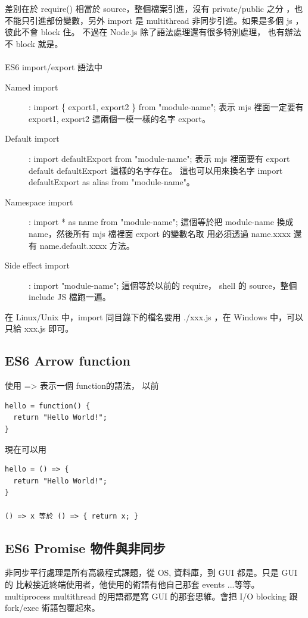   差別在於 require() 相當於 source，整個檔案引進，沒有 private/public 之分
  ，也不能只引進部份變數，另外 import 是 multithread 非同步引進。如果是多個
  js ，彼此不會 block 住。 不過在 Node.js 除了語法處理還有很多特別處理，
  也有辦法不 block 就是。
  \\\\
  ES6 import/export 語法中
  \begin{description}
    \item[Named import]: import \{ export1, export2 \} from "module-name";
      表示 mjs 裡面一定要有 export1, export2 這兩個一模一樣的名字 export。
    \item[Default import]: import defaultExport from "module-name";
      表示 mjs 裡面要有 export default defaultExport 這樣的名字存在。
      這也可以用來換名字 import defaultExport as alias from "module-name"。
    \item[Namespace import]: import * as name from "module-name";
      這個等於把 module-name 換成 name，然後所有 mjs 檔裡面 export 的變數名取
      用必須透過 name.xxxx 還有 name.default.xxxx 方法。
    \item[Side effect import]: import "module-name";
      這個等於以前的 require， shell 的 source，整個 include JS 檔跑一遍。
  \end{description}
  在 Linux/Unix 中，import 同目錄下的檔名要用 ./xxx.js ，在 Windows 中，可以
  只給 xxx.js 即可。

  \subsection{ES6 Arrow function}
  使用 => 表示一個 function的語法， 以前
  \begin{verbatim}
hello = function() {
  return "Hello World!";
}
  \end{verbatim}
  現在可以用
  \begin{verbatim}
hello = () => {
  return "Hello World!";
}

() => x 等於 () => { return x; }
  \end{verbatim}

  \subsection{ES6 Promise 物件與非同步}
  非同步平行處理是所有高級程式課題，從 OS, 資料庫，到 GUI 都是。只是 GUI 的
  比較接近終端使用者，他使用的術語有他自己那套 events ...等等。 multiprocess
  multithread 的用語都是寫 GUI 的那套思維。會把 I/O blocking 跟 fork/exec
  術語包覆起來。
